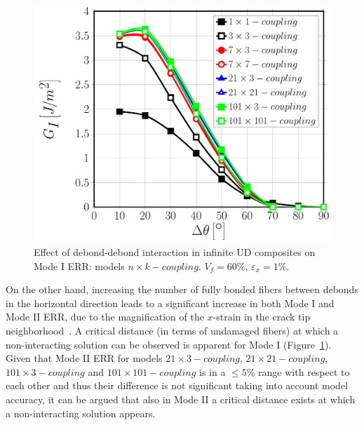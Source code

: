 \documentclass[smallextended]{svjour3}       %
\begin{document}
\begin{figure}[!h]
\centering
\includegraphics[width=\textwidth]{nxk-coupling-vf60-GI.pdf}
\caption{Effect of debond-debond interaction in infinite UD composites on Mode I ERR: models $n\times k-coupling$. $V_{f}=60\%$, $\varepsilon_{x}=1\%$.}\label{fig:debonddebondGI}
\end{figure}

On the other hand, increasing the number of fully bonded fibers between debonds in the horizontal direction leads to a significant increase in both Mode I and Mode II ERR, due to the magnification of the $x$-strain in the crack tip neighborhood~\cite{DiStasio2019}. A critical distance (in terms of undamaged fibers) at which a non-interacting solution can be observed is apparent for Mode I (Figure~\ref{fig:debonddebondGI}). Given that Mode II ERR for models $21\times 3-coupling$, $21\times 21-coupling$, $101\times 3-coupling$ and $101\times 101-coupling$ is in a $\leq5\%$ range with respect to each other and thus their difference is not significant taking into account model accuracy, it can be argued that also in Mode II a critical distance exists at which a non-interacting solution appears.
\end{document}

